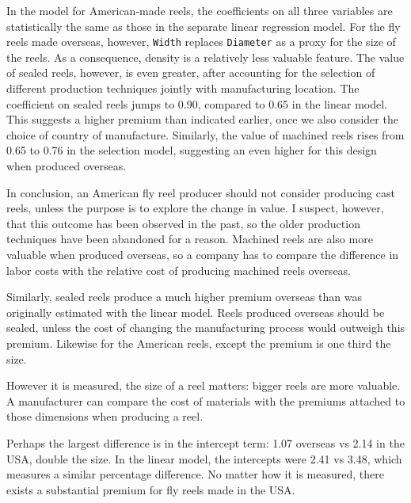 In the model for American-made reels,
the coefficients on all three variables are statistically
the same as those in the separate linear regression model.
% 
For the fly reels made overseas, however,
\texttt{Width} replaces \texttt{Diameter} as a proxy for the size of the reels.
As a consequence, density is a relatively less valuable feature.
The value of sealed reels, however, is even greater,
after accounting for the selection of different production techniques
jointly with manufacturing location.
The coefficient on sealed reels jumps to 0.90, compared to 0.65
in the linear model.
This suggests a higher premium than indicated earlier,
once we also consider the choice of country of manufacture.
Similarly, the value of machined reels rises from 0.65 to 0.76
in the selection model, suggesting an even higher
for this design when produced overseas.


In conclusion, an American fly reel producer should not consider
producing cast reels, unless the purpose is to explore the change in value.
I suspect, however, that this outcome has been observed in
the past, so the older production techniques have been abandoned for a reason.
Machined reels are also more valuable when produced overseas,
so a company has to compare the difference in labor costs with the relative
cost of producing machined reels overseas.

Similarly, sealed reels produce a much higher premium overseas
than was originally estimated with the linear model.
Reels produced overseas should be sealed, unless the cost of
changing the manufacturing process would outweigh this premium.
Likewise for the American reels, except the premium is one third the size.

However it is measured, the size of a reel matters:
bigger reels are more valuable.
A manufacturer can compare the cost of materials with
the premiums attached to those dimensions when producing a reel.

Perhaps the largest difference is in the intercept term:
1.07 overseas vs 2.14 in the USA, double the size.
In the linear model, the intercepts were 2.41 vs 3.48,
which measures a similar percentage difference.
No matter how it is measured, there exists a substantial premium
for fly reels made in the USA.




% 
